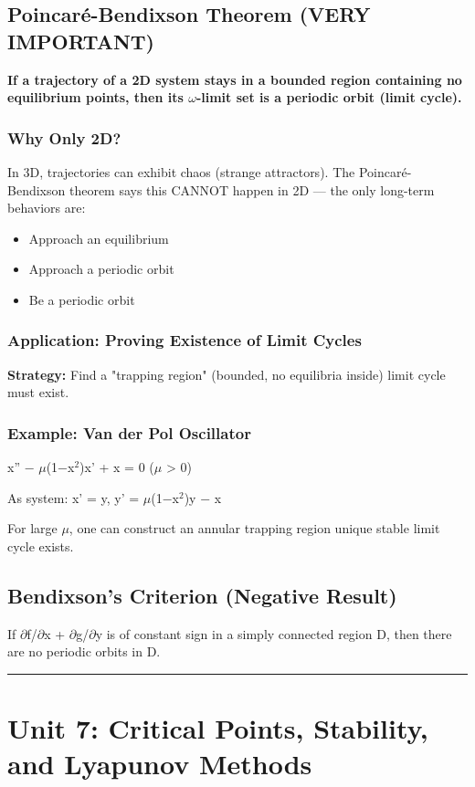 \documentclass[12pt,a4paper,openany]{book}
\begin{document}
{{\subsection{Poincaré-Bendixson Theorem  (VERY IMPORTANT)}

\textbf{If a trajectory of a 2D system stays in a bounded region containing no equilibrium points, then its $\omega$-limit set is a periodic orbit (limit cycle).}

\subsubsection{Why Only 2D?}
In 3D, trajectories can exhibit chaos (strange attractors). The Poincaré-Bendixson theorem says this CANNOT happen in 2D — the only long-term behaviors are:
\begin{itemize}
  \item Approach an equilibrium
  \item Approach a periodic orbit
  \item Be a periodic orbit
\end{itemize}

\subsubsection{Application: Proving Existence of Limit Cycles}
\textbf{Strategy:} Find a "trapping region" (bounded, no equilibria inside)  limit cycle must exist.

\subsubsection{Example: Van der Pol Oscillator}
x'' − $\mu$(1−x$^2$)x' + x = 0 ($\mu$ > 0)

As system: x' = y, y' = $\mu$(1−x$^2$)y − x

For large $\mu$, one can construct an annular trapping region  unique stable limit cycle exists.

\subsection{Bendixson's Criterion (Negative Result)}
If $\partial$f/$\partial$x + $\partial$g/$\partial$y is of constant sign in a simply connected region D, then there are no periodic orbits in D.

\bigskip\noindent\rule{\textwidth}{0.4pt}\bigskip

\section{Unit 7: Critical Points, Stability, and Lyapunov Methods }

}}
\end{document}
